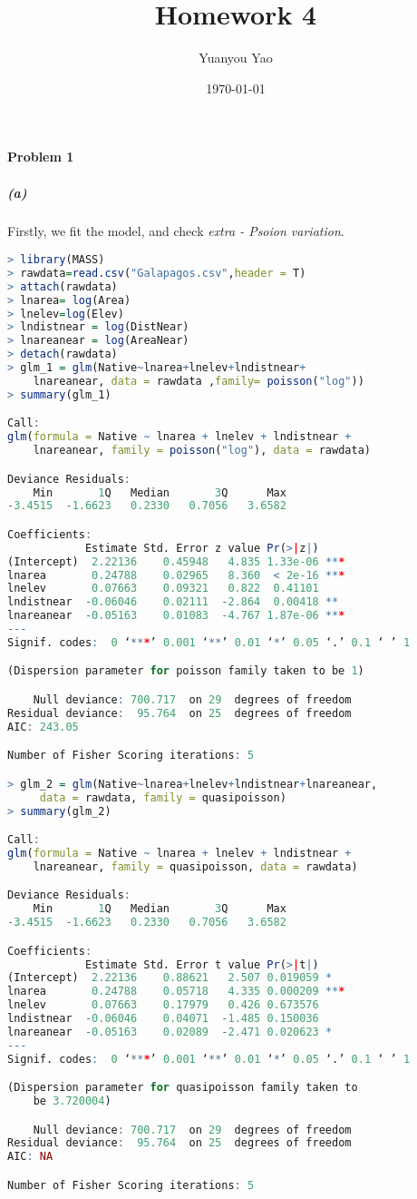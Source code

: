 \documentclass[12pt,a4paper]{article}
\title{Homework 4}
\author{Yuanyou Yao}
\date{\today}
\begin{document}
\maketitle
\paragraph{Problem 1}
\subparagraph{(a)}
Firstly, we fit the model, and check \emph{extra - Psoion variation}.
\begin{lstlisting}[language = R]
> library(MASS)
> rawdata=read.csv("Galapagos.csv",header = T)
> attach(rawdata)
> lnarea= log(Area)
> lnelev=log(Elev)
> lndistnear = log(DistNear) 
> lnareanear = log(AreaNear) 
> detach(rawdata) 
> glm_1 = glm(Native~lnarea+lnelev+lndistnear+
    lnareanear, data = rawdata ,family= poisson("log")) 
> summary(glm_1) 

Call:
glm(formula = Native ~ lnarea + lnelev + lndistnear + 
    lnareanear, family = poisson("log"), data = rawdata)

Deviance Residuals: 
    Min       1Q   Median       3Q      Max  
-3.4515  -1.6623   0.2330   0.7056   3.6582  

Coefficients:
            Estimate Std. Error z value Pr(>|z|)    
(Intercept)  2.22136    0.45948   4.835 1.33e-06 ***
lnarea       0.24788    0.02965   8.360  < 2e-16 ***
lnelev       0.07663    0.09321   0.822  0.41101    
lndistnear  -0.06046    0.02111  -2.864  0.00418 ** 
lnareanear  -0.05163    0.01083  -4.767 1.87e-06 ***
---
Signif. codes:  0 ‘***’ 0.001 ‘**’ 0.01 ‘*’ 0.05 ‘.’ 0.1 ‘ ’ 1

(Dispersion parameter for poisson family taken to be 1)

    Null deviance: 700.717  on 29  degrees of freedom
Residual deviance:  95.764  on 25  degrees of freedom
AIC: 243.05

Number of Fisher Scoring iterations: 5

> glm_2 = glm(Native~lnarea+lnelev+lndistnear+lnareanear, 
     data = rawdata, family = quasipoisson) 
> summary(glm_2)

Call:
glm(formula = Native ~ lnarea + lnelev + lndistnear + 
    lnareanear, family = quasipoisson, data = rawdata)

Deviance Residuals: 
    Min       1Q   Median       3Q      Max  
-3.4515  -1.6623   0.2330   0.7056   3.6582  

Coefficients:
            Estimate Std. Error t value Pr(>|t|)    
(Intercept)  2.22136    0.88621   2.507 0.019059 *  
lnarea       0.24788    0.05718   4.335 0.000209 ***
lnelev       0.07663    0.17979   0.426 0.673576    
lndistnear  -0.06046    0.04071  -1.485 0.150036    
lnareanear  -0.05163    0.02089  -2.471 0.020623 *  
---
Signif. codes:  0 ‘***’ 0.001 ‘**’ 0.01 ‘*’ 0.05 ‘.’ 0.1 ‘ ’ 1

(Dispersion parameter for quasipoisson family taken to 
    be 3.720004)

    Null deviance: 700.717  on 29  degrees of freedom
Residual deviance:  95.764  on 25  degrees of freedom
AIC: NA

Number of Fisher Scoring iterations: 5
\end{lstlisting}
\end{document}
